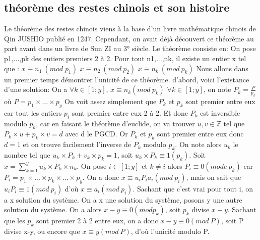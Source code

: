 \documentclass[a4paper, 11pt]{article}
\begin{document}
\subsection{théorème des restes chinois et son histoire}
Le théorème des restes chinois viens à la base d’un livre mathématique chinois de Qin JUSHIO publié en 1247. Cependant, on avait déjà découvert ce théorème au part avant dans un livre de Sun ZI au 3° siècle. Le théorème consiste en:
On pose p1,...,pk des entiers premiers 2 à 2. Pour tout n1,...,nk, il existe un entier x tel que :
\newline
$ x\equiv n_1 \: (mod \;  p_1)$ 
\newline
$ x\equiv n_2 \: (mod \: p_2)$
\newline
$ x \equiv n_k \:(mod\: p_k)$
\newline
\newline
\newline
Nous allons dans un premier temps démontrer l'unicité de ce théorème.
\newline
d'abord, voici l'existance d'une solution: \newline
On a $\forall k \in [1;y]  $, $x\equiv n_k (mod \: p_k)$ \newline
$\forall k \in [1;y] $, on note $P_k=\frac{P}{p_k} $ où $P=p_1 \times  ... \times p_y$ \newline
On voit assez simplement que $P_k$ et $p_k$ sont premier entre eux car tout les entiers $p_i$ sont premier entre eux 2 à 2. Et donc $P_k$ est inversible modulo 
$p_k$, car en faisant le théorème d'euclide, on va trouver $u,v\in \mathbb{Z}$ tel que $P_k\times u + p_k \times v = d$ avec d le PGCD. Or $P_k$ et $p_k$ sont premier entre eux donc $d=1$ et on trouve facilement l'inverse de $P_k$ modulo $p_k$. \newline
On note alors $u_k$ le nombre tel que $u_k\times P_k + v_k\times p_k= 1$, soit $u_k\times P_k\equiv 1(p_k)$. \newline
Soit $x=\sum_{k = 1}^{y} u_k\times P_k\times n_k$. On pose $i\in [1;y]$ et $k\neq i$ alors $P_i\equiv 0(mode \: p_k)$ car $P_i=p_1\times ... \times p_k \times ...\times p_y$. \newline
On a donc $x\equiv u_i P_i a_i(mod \: p_i)$, mais on sait que $u_i P_i\equiv 1 (mod \: p_i)$ d'où $x\equiv a_i (mod \: p_i)$. Sachant que c'est vrai pour tout i, on a x solution du système. \newline
\newline
On a x une solution du système, posons y une autre solution du système. On a alors $x-y\equiv 0( mod p_k)$, soit $p_k$ divise $x-y$. Sachant que les $p_k$ sont premier 2 à 2 entre eux, on a donc $x-y\equiv 0(mod \: P)$, soit P divise x-y, ou encore que $x\equiv y (mod \: P)$, d'où l'unicité modulo P.
\end{document}
